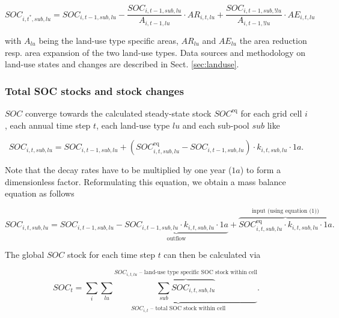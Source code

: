 \documentclass[gc, manuscript]{copernicus}
\begin{document}
\begin{equation}
SOC_{i,t^*,sub,lu} = SOC_{i,t-1,sub,lu} - \frac{SOC_{i,t-1,sub,lu}}{A_{i,t-1,lu}} \cdot  AR_{i,t,lu} + \frac{SOC_{i,t-1,sub,!lu}}{A_{i,t-1,!lu}} \cdot  AE_{i,t,lu}
\label{eq:ctransfer}
\end{equation}

with \(A_{lu}\) being the land-use type specific areas, \(AR_{lu}\) and \(AE_{lu}\) the area reduction resp. area expansion of the two land-use types. Data sources and methodology on land-use states and changes are described in Sect. \ref{sec:landuse}.

\hypertarget{sec:totalsoc}{%
\subsubsection{Total SOC stocks and stock changes}\label{sec:totalsoc}}

\(SOC\) converge towards the calculated steady-state stock \(SOC^{\mathrm{eq}}\) for each grid cell \(i\), each annual time step \(t\), each land-use type \(lu\) and each sub-pool \(sub\) like

\begin{equation}
SOC_{i,t,sub,lu} = SOC_{i,t-1,sub,lu} + (SOC^{\mathrm{eq}}_{i,t,sub,lu} - SOC_{i,t-1,sub,lu}) \cdot k_{i,t,sub,lu} \cdot 1\unit{a}.
\label{eq:SOCstate}
\end{equation}

Note that the decay rates have to be multiplied by one year (\(1a\)) to form a dimensionless factor.
Reformulating this equation, we obtain a mass balance equation as follows

\begin{equation}
SOC_{i,t,sub,lu} = SOC_{i,t-1,sub,lu} - \underbrace{SOC_{i,t-1,sub,lu} \cdot k_{i,t,sub,lu} \cdot 1\unit{a}}_{\text{outflow}} + \overbrace{SOC^{\mathrm{eq}}_{i,t,sub,lu} \cdot k_{i,t,sub,lu} \cdot 1\unit{a}}^{\text{input (using equation (1))}}.
\label{eq:steadystate2budget}
\end{equation}

The global \(SOC\) stock for each time step \(t\) can then be calculated via

\begin{equation}
SOC_{t} = \sum_{i} \underbrace{\sum_{lu} \overbrace{\sum_{sub} SOC_{i,t,sub,lu}}^{\text{$SOC_{i,t,lu}$ -- land-use type specific SOC stock within cell}}}_{\text{$SOC_{i,t}$ -- total SOC stock within cell}}.
\label{eq:totalstock}
\end{equation}
\end{document}
